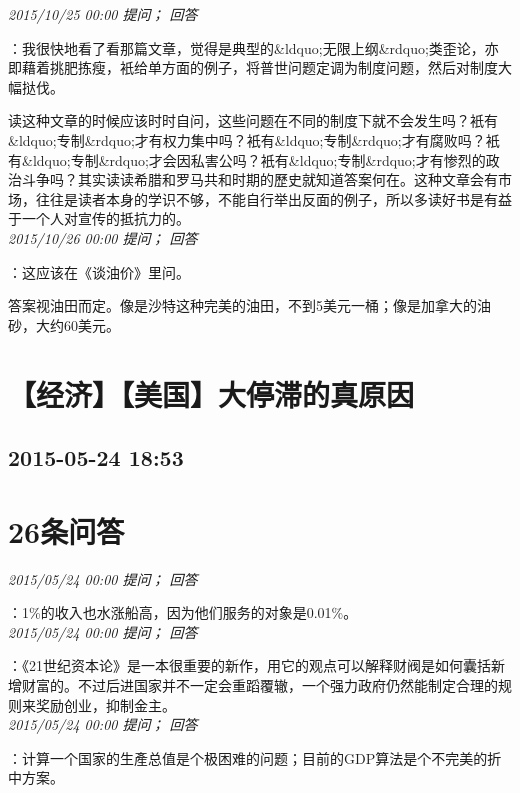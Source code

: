 \documentclass[twocolumn]{ctexart}
\begin{document}
\textit{\hfill\noindent\small 2015/10/25 00:00 提问； 回答}

：我很快地看了看那篇文章，觉得是典型的\&ldquo;无限上纲\&rdquo;类歪论，亦即藉着挑肥拣瘦，衹给单方面的例子，将普世问题定调为制度问题，然后对制度大幅挞伐。

读这种文章的时候应该时时自问，这些问题在不同的制度下就不会发生吗？衹有\&ldquo;专制\&rdquo;才有权力集中吗？衹有\&ldquo;专制\&rdquo;才有腐败吗？衹有\&ldquo;专制\&rdquo;才会因私害公吗？衹有\&ldquo;专制\&rdquo;才有惨烈的政治斗争吗？其实读读希腊和罗马共和时期的歷史就知道答案何在。这种文章会有市场，往往是读者本身的学识不够，不能自行举出反面的例子，所以多读好书是有益于一个人对宣传的抵抗力的。\\

\textit{\hfill\noindent\small 2015/10/26 00:00 提问； 回答}

：这应该在《谈油价》里问。

答案视油田而定。像是沙特这种完美的油田，不到5美元一桶；像是加拿大的油砂，大约60美元。\\


\section{【经济】【美国】大停滞的真原因}
\subsection{2015-05-24 18:53}


\section{26条问答}

\textit{\hfill\noindent\small 2015/05/24 00:00 提问； 回答}

：1\%的收入也水涨船高，因为他们服务的对象是0.01\%。\\

\textit{\hfill\noindent\small 2015/05/24 00:00 提问； 回答}

：《21世纪资本论》是一本很重要的新作，用它的观点可以解释财阀是如何囊括新增财富的。不过后进国家并不一定会重蹈覆辙，一个强力政府仍然能制定合理的规则来奖励创业，抑制金主。\\

\textit{\hfill\noindent\small 2015/05/24 00:00 提问； 回答}

：计算一个国家的生產总值是个极困难的问题；目前的GDP算法是个不完美的折中方案。
\end{document}
